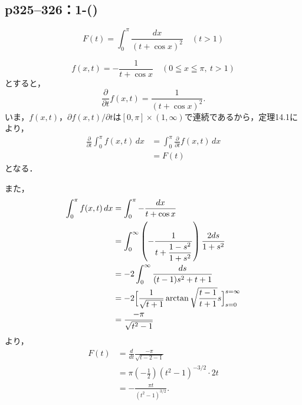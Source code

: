 \subsection*{p325--326：1-()}

\begin{tanswer}
    \[
        F(t) = \int_0^\pi \frac{dx}{(t + \cos x)^2} \quad (t > 1)
    \]

    \[
        f(x,t) = - \frac{1}{t+\cos x} \quad ( 0 \leqq x \leqq \pi , ~ t>1)
    \]
    とすると，
    \[
        \frac{\partial}{\partial t}  f(x,t) = \frac{1}{(t+\cos x)^2}.
    \]
    いま，$f(x,t)$，$\partial f(x,t) / \partial t $は$[0,\pi] \times (1,\infty)$で連続であるから，定理14.1により，
    \begin{align*}
        \frac{\partial}{\partial t} \int_0^\pi f(x,t) \, dx & = \int_0^\pi \frac{\partial}{\partial t} f(x,t) \, dx \\
                                                            & = F(t)
    \end{align*}
    となる．

    また，
    \begin{align*}
        \int_0^\pi f(x,t) \, dx & = \int_0^\pi - \frac{dx}{t+\cos x}                                                        \\
                                & = \int_0^\infty \left ( - \frac{1}{t+\dfrac{1-s^2}{1+s^2}} \right) \frac{2ds}{1+s^2}      \\
                                & = -2\int_0^\infty \frac{ds}{(t-1)s^2+t+1}                                                 \\
                                & = -2 \Bigl [ \frac{1}{\sqrt{t+1}} \arctan \sqrt{\frac{t-1}{t+1}}s \Bigr]_{s=0}^{s=\infty} \\
                                & = \frac{-\pi}{\sqrt{t^2-1}}
    \end{align*}
    より，
    \begin{align*}
        F(t) & = \frac{d}{dt} \frac{-\pi}{\sqrt{t-2-1}}                 \\
             & = \pi \left(-\frac{1}{2} \right) (t^2-1)^{-3/2} \cdot 2t \\
             & = -\frac{\pi t}{(t^2-1)^{3/2}}.
    \end{align*}
\end{tanswer}
